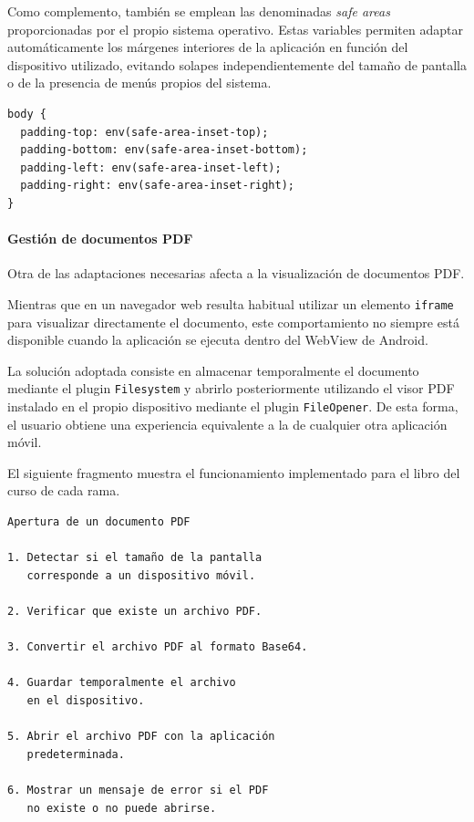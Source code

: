 Como complemento, también se emplean las denominadas \textit{safe areas} proporcionadas por el propio sistema operativo. Estas variables permiten adaptar automáticamente los márgenes interiores de la aplicación en función del dispositivo utilizado, evitando solapes independientemente del tamaño de pantalla o de la presencia de menús propios del sistema.

\begin{Verbatim}[frame=single, fontsize=\small, xleftmargin=10pt, xrightmargin=10pt]
body {
  padding-top: env(safe-area-inset-top);
  padding-bottom: env(safe-area-inset-bottom);
  padding-left: env(safe-area-inset-left);
  padding-right: env(safe-area-inset-right);
}
\end{Verbatim}

\paragraph{Gestión de documentos PDF}

Otra de las adaptaciones necesarias afecta a la visualización de documentos PDF.

Mientras que en un navegador web resulta habitual utilizar un elemento \texttt{iframe} para visualizar directamente el documento, este comportamiento no siempre está disponible cuando la aplicación se ejecuta dentro del WebView de Android.

La solución adoptada consiste en almacenar temporalmente el documento mediante el plugin \texttt{Filesystem} y abrirlo posteriormente utilizando el visor PDF instalado en el propio dispositivo mediante el plugin \texttt{FileOpener}. De esta forma, el usuario obtiene una experiencia equivalente a la de cualquier otra aplicación móvil.

El siguiente fragmento muestra el funcionamiento implementado para el libro del curso de cada rama.

\begin{Verbatim}[frame=single, fontsize=\small]
Apertura de un documento PDF

1. Detectar si el tamaño de la pantalla
   corresponde a un dispositivo móvil.

2. Verificar que existe un archivo PDF.

3. Convertir el archivo PDF al formato Base64.

4. Guardar temporalmente el archivo
   en el dispositivo.

5. Abrir el archivo PDF con la aplicación
   predeterminada.

6. Mostrar un mensaje de error si el PDF
   no existe o no puede abrirse.
\end{Verbatim}

